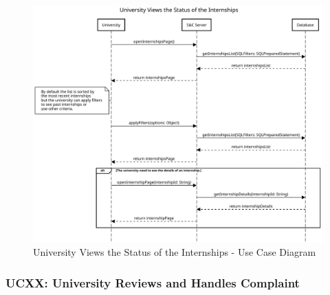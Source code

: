 \begin{figure}[H]
    \centering
    \includegraphics[width=1.0\textwidth]{Images/UC_15.pdf}
    \caption{University Views the Status of the Internships - Use Case Diagram}
    \label{fig:use-case-diagram-15}
\end{figure}

\subsubsection{UCXX: University Reviews and Handles Complaint}
\label{subsubsec:university-reviews-and-handles-complaint}

